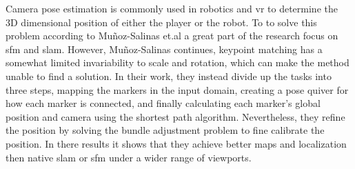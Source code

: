 Camera pose estimation is commonly used in robotics and \ac{vr} to determine the 3D dimensional position of either the player or the robot.
To to solve this problem according to Mu{\~n}oz-Salinas et.al\cite{munoz2018mapping} a great part of the research focus on \ac{sfm} and \ac{slam}.
However, Mu{\~n}oz-Salinas continues, keypoint matching has a somewhat limited invariability to scale and rotation, which can make the method unable to find a solution.
In their work, they instead divide up the tasks into three steps, mapping the markers in the input domain, creating a pose quiver for how each marker is connected, and finally calculating each marker's global position and camera using the shortest path algorithm.
Nevertheless, they refine the position by solving the bundle adjustment problem to fine calibrate the position.
In there results it shows that they achieve better maps and localization then native \ac{slam} or \ac{sfm} under a wider range of viewports.




